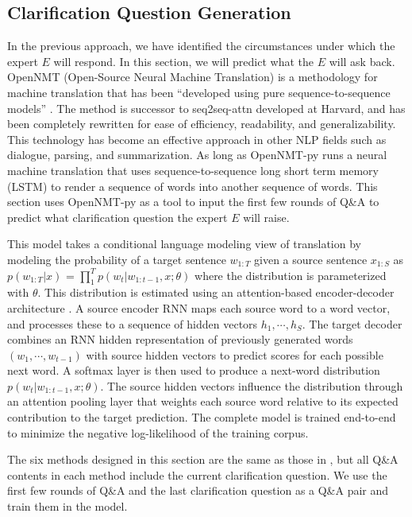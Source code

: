 \subsection{Clarification Question Generation}
\label{sec:gen}
In the previous approach, we have identified the circumstances under which the expert $E$ will respond. In this section, we will predict what the $E$ will ask back.
OpenNMT (Open-Source Neural Machine Translation) is a methodology for machine translation that has been ``developed using pure sequence-to-sequence models'' \citep{DBLP:conf/acl/KleinKDSR17}. The method is successor to seq2seq-attn developed at Harvard, and has been completely rewritten for ease of efficiency, readability, and generalizability. This technology has become an effective approach in other NLP fields such as dialogue, parsing, and summarization. 
 As long as OpenNMT-py runs a neural machine translation that uses sequence-to-sequence long short term memory (LSTM) to render a sequence of words into another sequence of words. This section uses OpenNMT-py as a tool to input the first few rounds of Q\&A to predict what clarification question the expert $E$ will raise.

This model takes a conditional language modeling view of translation by modeling the probability of a target sentence $w_{1:T}$ given a source sentence $x_{1:S}$ as 
$p\left( w_{1:T}|x \right)$ = $\prod_{1}^{T}p\left( w_{t}|w_{1:t-1},x;\theta \right)$ where the distribution is parameterized with $\theta$. This distribution is estimated using an attention-based encoder-decoder architecture \citep{DBLP:journals/corr/BahdanauCB14}. A source encoder RNN maps each source word to a word vector, and processes these to a sequence of hidden vectors $h_{1},\cdots,h_{S}$. The target decoder combines an RNN hidden representation of previously generated words $\left( w_{1},\cdots,w_{t-1} \right)$ with source hidden vectors to predict scores for each possible next word. A softmax layer is then used to produce a next-word distribution $p\left( w_{t}|w_{1:t-1},x;\theta \right)$. The source hidden vectors influence the distribution through an attention pooling layer that weights each source word relative to its expected contribution to the target prediction. The complete model is trained end-to-end to minimize the negative log-likelihood of the training corpus.

 The six methods designed in this section are the same as those in , but all Q\&A contents in each method include the current clarification question. We use the first few rounds of Q\&A and the last clarification question as a Q\&A pair and train them in the model. 
